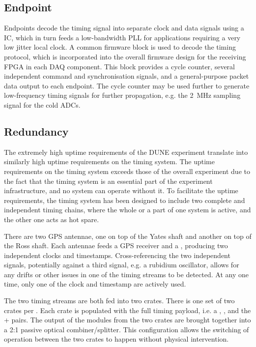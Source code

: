 \documentclass{dune}
\begin{document}
\subsection{Endpoint}
Endpoints decode the timing signal into separate clock and data
signals using a  IC, which in turn feeds a low-bandwidth PLL for applications requiring a very low jitter local clock. A common firmware block is used to decode the timing protocol, which is incorporated into the overall firmware design for the receiving FPGA in each DAQ component. This block provides a cycle counter, several independent command and synchronisation signals, and a general-purpose packet data output to each endpoint. The cycle counter may be used further to generate low-frequency timing signals for further propagation, e.g. the \SI{2}{\MHz} sampling signal for the cold ADCs.
\subsection{Redundancy}
The extremely high uptime requirements of the DUNE experiment translate into similarly high uptime requirements on the timing system. The uptime requirements on the timing system exceeds those of the overall experiment due to the fact that the timing system is an essential part of the experiment infrastructure, and no system can operate without it. To facilitate the uptime requirements, the timing system has been designed to include two complete and independent timing chains, where the whole or a part of one system is active, and the other one acts as hot spare.

There are two GPS antennae, one on top of the Yates shaft and another on top of the Ross shaft. Each antennae feeds a GPS receiver and a , producing two independent  clocks and timestamps. Cross-referencing the two independent signals, potentially against a third signal, e.g. a rubidium oscillator, allows for any drifts or other issues in one of the  timing streams to be detected. At any one time, only one of the  clock and timestamp are actively used.

The two  timing streams are both fed into two  crates. There is one set of two  crates per . Each crate is populated with the full timing  payload, i.e. a , , and the + pairs. The output of the  modules from the two  crates are brought together into a 2:1 passive optical combiner/splitter. This configuration allows the switching of operation between the two crates to happen without physical intervention. 
\end{document}
